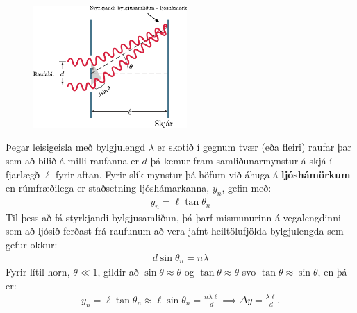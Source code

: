 \begin{tcolorbox}
\begin{minipage}{\linewidth}
\begin{figure}
\vspace{-0.5cm}
\includegraphics[width = 2.3in]{figures/young-raufar.pdf}
\end{figure}
Þegar leisigeisla með bylgjulengd $\lambda$ er skotið í gegnum tvær (eða fleiri) raufar þar sem að bilið á milli raufanna er $d$ þá kemur fram samliðunarmynstur á skjá í fjarlægð $\ell$ fyrir aftan. Fyrir slík mynstur þá höfum við áhuga á \textbf{ljóshámörkum} en rúmfræðilega er staðsetning ljóshámarkanna, $y_n$, gefin með:
\begin{align*}
    y_n = \ell \tan\theta_n
\end{align*}
Til þess að fá styrkjandi bylgjusamliðun, þá þarf mismunurinn á vegalengdinni sem að ljósið ferðast frá raufunum að vera jafnt heiltölufjölda bylgjulengda sem gefur okkur:
\begin{align*}
   d\sin\theta_n = n \lambda
\end{align*}
Fyrir lítil horn, $\theta \ll 1$, gildir að $\sin\theta \approx \theta$ og $\tan\theta \approx \theta$ svo $\tan\theta \approx \sin\theta$, en þá er:
\begin{align*}
    y_n = \ell \tan\theta_n \approx \ell \sin\theta_n = \frac{n  \lambda \ell}{d} \implies \Delta y = \frac{\lambda \ell }{d}.
\end{align*}
\end{minipage}
\end{tcolorbox}

